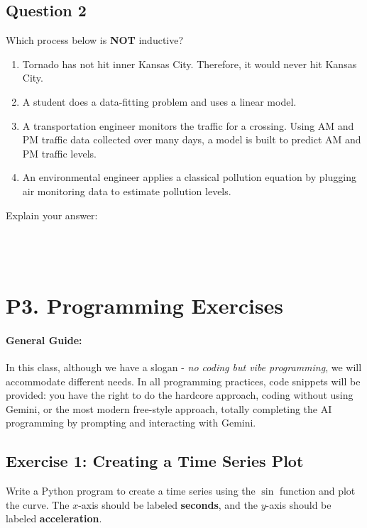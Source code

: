 \documentclass[12pt]{article}
\begin{document}
\subsection*{Question 2}
Which process below is \textbf{NOT} inductive?

\begin{enumerate}
    \item Tornado has not hit inner Kansas City. Therefore, it would never hit Kansas City.
    \item A student does a data-fitting problem and uses a linear model.
    \item A transportation engineer monitors the traffic for a crossing. Using AM and PM traffic data collected over many days, a model is built to predict AM and PM traffic levels.
    \item An environmental engineer applies a classical pollution equation by plugging air monitoring data to estimate pollution levels.
\end{enumerate}

Explain your answer:\\
\fullunderline\\ 
\fullunderline \\ 
\fullunderline \\
\fullunderline

\newpage
\section*{P3. Programming Exercises}

\paragraph{General Guide:} In this class, although we have a slogan - \textit{no coding but vibe programming}, we will accommodate different needs. In all programming practices, code snippets will be provided: you have the right to do the hardcore approach, coding without using Gemini, or the most modern free-style approach, totally completing the AI programming by prompting and interacting with Gemini. 

\subsection*{Exercise 1: Creating a Time Series Plot}
Write a Python program to create a time series using the $\sin$ function and plot the curve. The $x$-axis should be labeled \textbf{seconds}, and the $y$-axis should be labeled \textbf{acceleration}.
\end{document}
